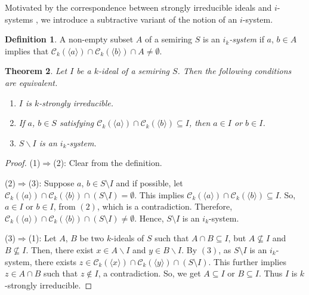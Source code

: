 \documentclass[11pt,leqno]{amsart}
\newtheorem{theorem}{Theorem}[section]
\theoremstyle{definition}
\newtheorem{definition}[theorem]{Definition}
\numberwithin{equation}{section}
\begin{document}
Motivated by the correspondence between strongly irreducible ideals and $i$-systems \cite[Proposition 7.33]{Golan}, we introduce a subtractive variant of the notion of an $i$-system.

\begin{definition}
    A non-empty subset $A$ of a semiring $S$ is an \emph{$i_k$-system} if $a$, $b \in A $ implies that $\mathcal{C}_k(\langle a\rangle) \cap \mathcal{C}_k(\langle b\rangle) \cap A \neq \emptyset$.
\end{definition}

\begin{theorem}\label{loc11}
    Let $I$ be a $k$-ideal of a semiring $S$. Then the following conditions are equivalent.
    \begin{enumerate}
        \item $I$ is $k$-strongly irreducible.
        \item If $a$, $b \in S$ satisfying $\mathcal{C}_k(\langle a\rangle) \cap \mathcal{C}_k(\langle b\rangle) \subseteq I$, then $a \in I$ or $b \in I$.
        \item $S\backslash I$ is an $i_k$-system.
    \end{enumerate}
\end{theorem}

\begin{proof}
    (1)$\Rightarrow$(2): Clear from the definition. 

    
    (2)$\Rightarrow$(3): Suppose $a$, $b \in S\setminus I$ and if possible, let $\mathcal{C}_k(\langle a\rangle) \cap \mathcal{C}_k(\langle b\rangle) \cap (S \setminus I)= \emptyset$. This implies $\mathcal{C}_k(\langle a\rangle) \cap \mathcal{C}_k(\langle b\rangle) \subseteq I$. So, $a \in I$ or $b \in I$, from $(2)$, which is a contradiction. Therefore, $\mathcal{C}_k(\langle a\rangle) \cap \mathcal{C}_k(\langle b\rangle) \cap (S \setminus I) \neq \emptyset$. Hence, $S \setminus I$ is an $i_k$-system.

    
    (3)$ \Rightarrow $(1):
    Let $A$, $B$ be two $k$-ideals of $S$ such that $A \cap B \subseteq I$, but $A \nsubseteq I$ and $B \nsubseteq I$. Then, there exist $x \in A \backslash I$ and $y \in B \backslash I$. By $(3)$, as $S \setminus I$ is an $i_k$-system, there exists $z \in \mathcal{C}_k(\langle x\rangle) \cap \mathcal{C}_k(\langle y\rangle) \cap (S \setminus I)$. This further implies $z \in A \cap B$ such that $z \notin I$, a contradiction. So, we get $A \subseteq I$ or $B \subseteq I$. Thus $I$ is $k$-strongly irreducible.
\end{proof}
\end{document}
